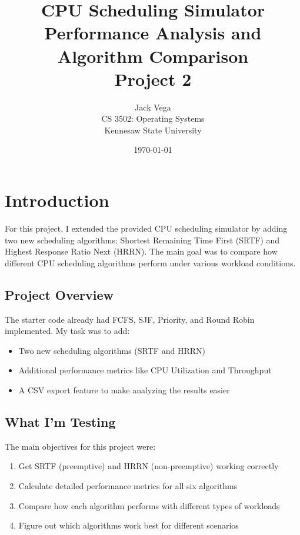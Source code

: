 \documentclass[12pt,letterpaper]{article}
\title{
    \textbf{CPU Scheduling Simulator}\\
    \large Performance Analysis and Algorithm Comparison\\
    \vspace{1cm}
    Project 2
}
\author{
    Jack Vega\\
    CS 3502: Operating Systems\\
    Kennesaw State University
}
\date{\today}
\begin{document}
\maketitle
\newpage

\tableofcontents
\newpage

\section{Introduction}

For this project, I extended the provided CPU scheduling simulator by adding 
two new scheduling algorithms: Shortest Remaining Time First (SRTF) and 
Highest Response Ratio Next (HRRN). The main goal was to compare how different 
CPU scheduling algorithms perform under various workload conditions.

\subsection{Project Overview}

The starter code already had FCFS, SJF, Priority, and Round Robin implemented. 
My task was to add:

\begin{itemize}
    \item Two new scheduling algorithms (SRTF and HRRN)
    \item Additional performance metrics like CPU Utilization and Throughput
    \item A CSV export feature to make analyzing the results easier
\end{itemize}

\subsection{What I'm Testing}

The main objectives for this project were:

\begin{enumerate}
    \item Get SRTF (preemptive) and HRRN (non-preemptive) working correctly
    \item Calculate detailed performance metrics for all six algorithms
    \item Compare how each algorithm performs with different types of workloads
    \item Figure out which algorithms work best for different scenarios
\end{enumerate}
\end{document}
